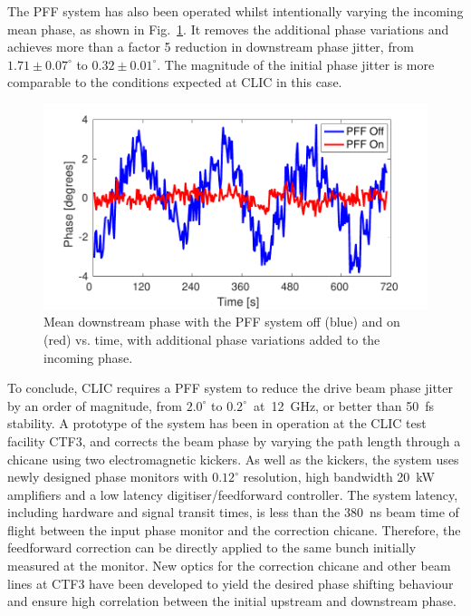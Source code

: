 \documentclass[%
 reprint,
superscriptaddress,
 amsmath,amssymb,
 prl,
]{revtex4-1}
\begin{document}
The PFF system has also been operated 
whilst intentionally varying the incoming mean phase, as shown in 
Fig.~\ref{fig:wiggle}. It removes the additional phase variations 
and achieves more than a factor 5 reduction in downstream phase jitter, from 
\(1.71\pm0.07^\circ\) to \(0.32\pm0.01^\circ\). The magnitude of 
the initial phase jitter is more comparable to the conditions expected at CLIC 
in this case.

\begin{figure}
	\includegraphics[width=\columnwidth]{figs/wiggle}
	\caption{\label{fig:wiggle}Mean downstream phase with the PFF system off 
		(blue) and on (red) vs. time, with additional phase variations added to 
		the 
		incoming phase.}
\end{figure}

To conclude, CLIC requires a PFF system to reduce the drive beam phase jitter 
by an order of magnitude, from \(2.0^\circ\) to \(0.2^\circ\)~at~12~GHz, or 
better than 50~fs stability. A prototype of the system has been 
in operation at the CLIC test facility CTF3, and corrects the beam phase by 
varying the path length through a chicane using two electromagnetic kickers. 
As well as the kickers, the system uses newly designed phase monitors with 
\(0.12^\circ\) resolution, high bandwidth 20~kW amplifiers and a low latency 
digitiser/feedforward controller. The system latency, including hardware and 
signal transit times, is less than the 380~ns beam time of flight between the 
input phase monitor and the correction chicane. Therefore, the feedforward 
correction can be directly applied to the same bunch initially measured at the 
monitor. New optics for the correction chicane and other beam lines at CTF3 
have been 
developed to yield the desired phase shifting behaviour and ensure high 
correlation between the initial upstream and downstream phase.
\end{document}
